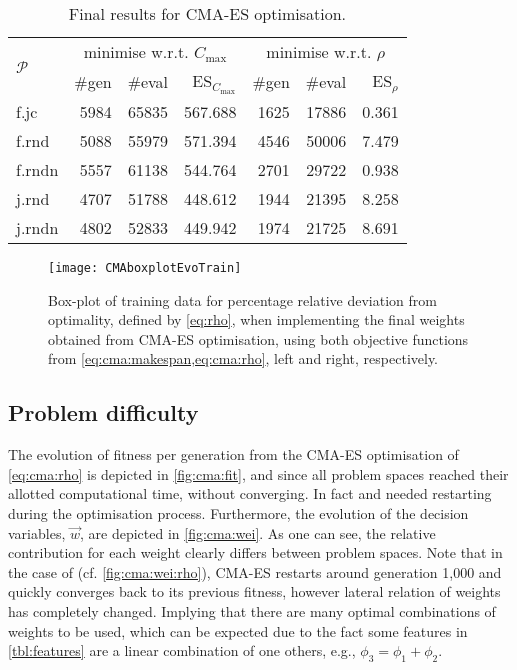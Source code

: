 \begin{table}\centering
\caption{Final results for CMA-ES optimisation.}\label{cma:funeval}
\begin{tabular}{l |rrr |rrr}\toprule
\multirow{2}{*}{$\mathcal{P}$}
& \multicolumn{3}{c|}{minimise w.r.t. $C_{\max}$}& \multicolumn{3}{c}{minimise w.r.t. $\rho$} \\
 & \#gen & \#eval & ES$_{C_{\max}}$ & \#gen & \#eval & ES$_\rho$ \\
\midrule
f.jc & 5984 & 65835 & 567.688  & 1625 & 17886 & 0.361 \\
f.rnd & 5088 & 55979 & 571.394 & 4546 & 50006 & 7.479 \\
f.rndn & 5557 & 61138 & 544.764 & 2701 & 29722 & 0.938 \\
j.rnd & 4707 & 51788 & 448.612 & 1944 & 21395 & 8.258 \\
j.rndn & 4802 & 52833 & 449.942 & 1974 & 21725 & 8.691 \\
\bottomrule
\end{tabular}
\end{table}

\begin{figure}
\texttt{[image: CMAboxplotEvoTrain]}
\caption{Box-plot of training data for percentage relative deviation from optimality, defined by \cref{eq:rho}, when implementing the final weights obtained from CMA-ES optimisation, using both objective functions from \cref{eq:cma:makespan,eq:cma:rho}, left and right, respectively.}\label{fig:cma:trainboxpl}
\end{figure}

\subsection{Problem difficulty}\label{sec:expr:data}
The evolution of fitness per generation from the CMA-ES optimisation of \cref{eq:cma:rho} is depicted in \cref{fig:cma:fit}, and since all problem spaces reached their allotted computational time, without converging. In fact  and  needed restarting during the optimisation process. 
Furthermore, the  evolution of the decision variables, $\vec{w}$, are depicted in \cref{fig:cma:wei}. As one can see, the relative contribution for each weight clearly differs between problem spaces. Note that in the case of  (cf. \cref{fig:cma:wei:rho}), CMA-ES restarts around generation 1,000 and quickly converges back to its previous fitness, however lateral relation of weights has completely changed. Implying that there are many optimal combinations of weights to be used, which can be expected due  to the fact some features in \cref{tbl:features} are a linear combination of one others, e.g., $\phi_3=\phi_1+\phi_2$.

